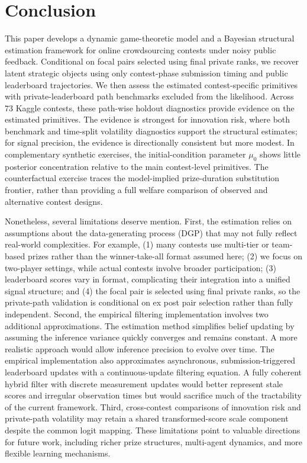 \documentclass[mnsc]{informs3}
\begin{document}
\section{Conclusion}

This paper develops a dynamic game-theoretic model and a Bayesian structural estimation framework for online crowdsourcing contests under noisy public feedback.
Conditional on focal pairs selected using final private ranks, we recover latent strategic objects using only contest-phase submission timing and public leaderboard trajectories. We then assess the estimated contest-specific primitives with private-leaderboard path benchmarks excluded from the likelihood.
Across 73 Kaggle contests, these path-wise holdout diagnostics provide evidence on the estimated primitives.
The evidence is strongest for innovation risk, where both benchmark and time-split volatility diagnostics support the structural estimates; for signal precision, the evidence is directionally consistent but more modest.
In complementary synthetic exercises, the initial-condition parameter $\mu_0$ shows little posterior concentration relative to the main contest-level primitives.
The counterfactual exercise traces the model-implied prize-duration substitution frontier, rather than providing a full welfare comparison of observed and alternative contest designs.


Nonetheless, several limitations deserve mention.
First, the estimation relies on assumptions about the data-generating process (DGP) that may not fully reflect real-world complexities.
For example,
(1) many contests use multi-tier or team-based prizes rather than the winner-take-all format assumed here;
(2) we focus on two-player settings, while actual contests involve broader participation;
(3) leaderboard scores vary in format, complicating their integration into a unified signal structure; and
(4) the focal pair is selected using final private ranks, so the private-path validation is conditional on ex post pair selection rather than fully independent.
Second, the empirical filtering implementation involves two additional approximations. The estimation method simplifies belief updating by assuming the inference variance quickly converges and remains constant.
A more realistic approach would allow inference precision to evolve over time.
The empirical implementation also approximates asynchronous, submission-triggered leaderboard updates with a continuous-update filtering equation. A fully coherent hybrid filter with discrete measurement updates would better represent stale scores and irregular observation times but would sacrifice much of the tractability of the current framework.
Third, cross-contest comparisons of innovation risk and private-path volatility may retain a shared transformed-score scale component despite the common logit mapping.
These limitations point to valuable directions for future work, including richer prize structures, multi-agent dynamics, and more flexible learning mechanisms.
\end{document}
